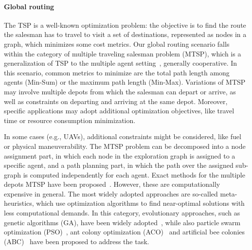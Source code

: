\paragraph{Global routing}
The TSP is a well-known optimization problem: the objective is to find the route the salesman has to travel to visit a set of destinations, represented as nodes in a graph, which minimizes some cost metrics. 
Our global routing scenario falls within the category of multiple traveling salesman problem (MTSP), which is a generalization of TSP to the multiple agent setting~\cite {cheikhrouhou2021comprehensive}, generally cooperative.
In this scenario, common metrics to minimize are the total path length among agents (Min-Sum) or the maximum path length (Min-Max). 
Variations of MTSP may involve multiple depots from which the salesman can depart or arrive, as well as constraints on departing and arriving at the same depot. 
Moreover, specific applications may adopt additional optimization objectives, like travel time or resource consumption minimization. 

In some cases (e.g., UAVs), additional constraints might be considered, like fuel or physical maneuverability. 
The MTSP problem can be decomposed into a node assignment part, in which each node in the exploration graph is assigned to a specific agent, and a path planning part, in which the path over the assigned sub-graph is computed independently for each agent. 
Exact methods for the multiple depots MTSP have been proposed~\citep{oberlin2009transformation, sundar2017algorithms}. 
However, these are computationally expensive in general. 
The most widely adopted approaches are so-called meta-heuristics, which use optimization algorithms to find near-optimal solutions with less computational demands. 
In this category, evolutionary approaches, such as genetic algorithms (GA), have been widely adopted~\citep{al2019comparative, bolanos2015multiobjective, yuan2013new}, while also particle swarm optimization (PSO)~\citep{wei2020particle}, ant colony optimization (ACO)~\citep{lu2019mission} and artificial bee colonies (ABC)~\citep{venkatesh2015two} have been proposed to address the task. 

